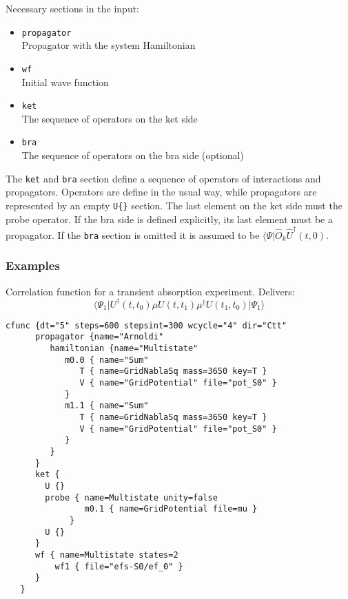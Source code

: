\documentclass[a4paper,12pt]{scrbook}
\newcommand{\da}{^\dagger}
\newcommand{\br}[1]{\langle #1 \vert}
\newcommand{\option}[2]{\item \texttt{#1}\\ #2}
\newcommand{\code}[1]{\texttt{#1}}
\begin{document}
Necessary sections in the input:
\begin{itemize}
 \option{propagator}{Propagator with the system Hamiltonian}
 \option{wf}{Initial wave function}
 \option{ket}{The sequence of operators on the ket side}
 \option{bra}{The sequence of operators on the bra side (optional)}
\end{itemize}
The \code{ket} and \code{bra} section define a sequence of operators of interactions
and propagators. Operators are define in the usual way, while propagators
are represented by an empty \code{U\{\}} section.
The last element on the ket side must the probe operator. If the bra side
is defined explicitly, its last element must be a propagator.
If the \code{bra} section is omitted it is assumed to be $\br{\Psi}\hat O_k \hat U\da(t,0)$.

\subsubsection*{Examples}
Correlation function for a transient absorption experiment.
Delivers:
\begin{equation*}
\langle \Psi_1\rvert U^\dagger(t,t_0)\mu U(t,t_1)\mu^\dagger U(t_1,t_0)\lvert\Psi_1\rangle
\end{equation*}
\begin{verbatim}
cfunc {dt="5" steps=600 stepsint=300 wcycle="4" dir="Ctt"
      propagator {name="Arnoldi"
         hamiltonian {name="Multistate"
            m0.0 { name="Sum"
               T { name=GridNablaSq mass=3650 key=T }
               V { name="GridPotential" file="pot_S0" }
            }
            m1.1 { name="Sum"
               T { name=GridNablaSq mass=3650 key=T }
               V { name="GridPotential" file="pot_S0" }
            }
         }
      }
      ket {
        U {}
        probe { name=Multistate unity=false
                m0.1 { name=GridPotential file=mu }
             }
        U {}
      }
      wf { name=Multistate states=2
          wf1 { file="efs-S0/ef_0" }
      }
   }

\end{verbatim}
\end{document}
